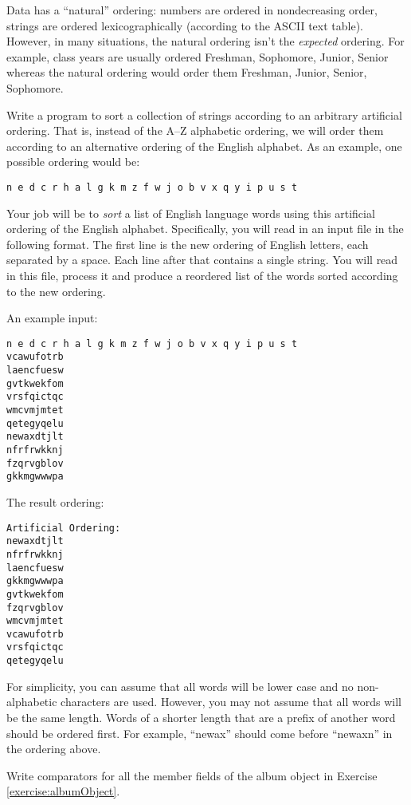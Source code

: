 \begin{exer}
Data has a ``natural'' ordering: numbers are ordered in nondecreasing 
order, strings are ordered lexicographically (according to the ASCII text 
table).  However, in many situations, the natural ordering isn't the 
\emph{expected} ordering.  For example, class years are usually ordered Freshman, Sophomore, Junior, Senior whereas the natural ordering 
would order them Freshman, Junior, Senior, Sophomore.  

Write a program to sort a collection of strings according to 
an arbitrary artificial ordering.  That is, instead of the A--Z 
alphabetic ordering, we will order them according to an alternative 
ordering of the English alphabet.  As an example, one possible
ordering would be:

\texttt{n e d c r h a l g k m z f w j o b v x q y i p u s t}

Your job will be to \emph{sort} a list of English language words 
using this artificial ordering of the English alphabet.  Specifically, 
you will read in an input file in the following format.  The first line 
is the new ordering of English letters, each separated by a space.  
Each line after that contains a single string.  
You will read in this file, process it and produce a reordered list 
of the words sorted according to the new ordering.  

An example input:

\begin{verbatim}
n e d c r h a l g k m z f w j o b v x q y i p u s t
vcawufotrb
laencfuesw
gvtkwekfom
vrsfqictqc
wmcvmjmtet
qetegyqelu
newaxdtjlt
nfrfrwkknj
fzqrvgblov
gkkmgwwwpa
\end{verbatim}

The result ordering: 

\begin{verbatim}
Artificial Ordering: 
newaxdtjlt
nfrfrwkknj
laencfuesw
gkkmgwwwpa
gvtkwekfom
fzqrvgblov
wmcvmjmtet
vcawufotrb
vrsfqictqc
qetegyqelu
\end{verbatim}

For simplicity, you can assume that all words will be lower 
case and no non-alphabetic characters are used.  However, 
you may not assume that all words will be the same length. 
Words of a shorter length that are a prefix of another word 
should be ordered first.  For example, ``newax'' should come 
before ``newaxn'' in the ordering above.
\end{exer}

\begin{exer}
Write comparators for all the member fields of the album
object in Exercise \ref{exercise:albumObject}.
\end{exer}

